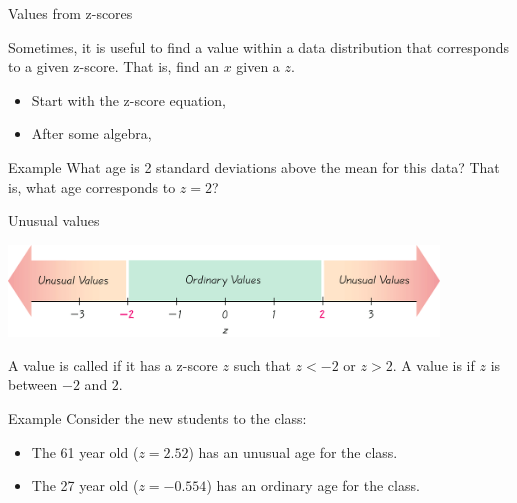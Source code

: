 \documentclass[xcolor=table, aspectratio=169, bigger]{beamer}
\begin{document}
\begin{frame}{Values from z-scores}
\begin{block}{}
Sometimes, it is useful to find a value within a data distribution that corresponds to a given z-score. That is, find an $x$ given a $z$. 
\medskip
\begin{itemize}
\pause\item Start with the z-score equation, \\
\smallskip
{}
\pause\item After some algebra,\\
\smallskip
{}
\end{itemize}
\end{block}

\pause
\begin{exampleblock}{Example}
What age is 2 standard deviations above the mean for this data? That is, what age corresponds to $z=2$?\\
\smallskip
\pause
{}
\end{exampleblock}
\end{frame}

\begin{frame}{Unusual values}

{\centering
\includegraphics[width=4.5in]{../images/ch03_unusual} \par
}

\begin{block}{}
A value is called  if it has a z-score $z$ such that $z< -2$ or $z > 2$. A value is  if $z$ is between $-2$ and $2$.
\end{block}

\pause
\begin{exampleblock}{Example}
Consider the new students to the class:
\begin{itemize}
\item The 61 year old ($z=2.52$) has an unusual age for the class. 
\item The 27 year old ($z=-0.554$) has an ordinary age for the class.
\end{itemize}
\end{exampleblock}
\end{frame}
\end{document}
